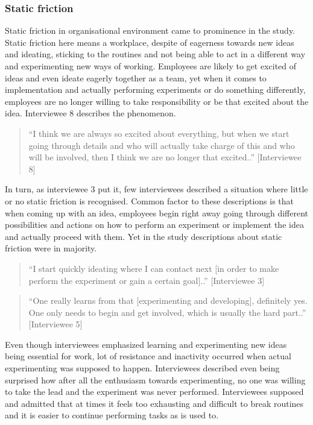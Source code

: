 \subsubsection{Static friction}
Static friction in organisational environment came to prominence in the study.  Static friction here means a workplace, despite of eagerness towards new ideas and ideating, sticking to the routines and not being able to act in a different way and experimenting new ways of working. Employees are likely to get excited of ideas and even ideate eagerly together as a team, yet when it comes to implementation and actually performing experiments or do something differently, employees are no longer willing to take responsibility or be that excited about the idea. Interviewee 8 describes the phenomenon.
\begin{quote}
``I think we are always so excited about everything, but when we start going through details and who will actually take charge of this and who will be involved, then I think we are no longer that excited..'' [Interviewee 8]
\end{quote}
In turn, as interviewee 3 put it, few interviewees described a situation where little or no static friction is recognised. Common factor to these descriptions is that when coming up with an idea, employees begin right away going through different possibilities and actions on how to perform an experiment or implement the idea and actually proceed with them. Yet in the study descriptions about static friction were in majority. 
\begin{quote}
``I start quickly ideating where I can contact next [in order to make perform the experiment or gain a certain goal]..'' [Interviewee 3]
\end{quote}
\begin{quote}
``One really learns from that [experimenting and developing], definitely yes. One only needs to begin and get involved, which is usually the hard part..'' [Interviewee 5]
\end{quote}
Even though interviewees emphasized learning and experimenting new ideas being essential for work, lot of resistance and inactivity occurred when actual experimenting was supposed to happen. Interviewees described even being surprised how after all the enthusiasm towards experimenting, no one was willing to take the lead and the experiment was never performed. Interviewees supposed and admitted that at times it feels too exhausting and difficult to break routines and it is easier to continue performing tasks as is used to. 


